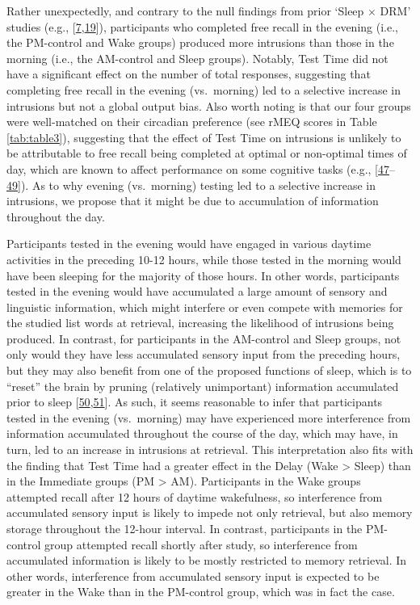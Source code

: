 \documentclass[
]{article}
\begin{document}
Rather unexpectedly, and contrary to the null findings from prior `Sleep \(\times\) DRM' studies (e.g., {[}\protect\hyperlink{ref-payne2009a}{7},\protect\hyperlink{ref-mckeon2012a}{19}{]}), participants who completed free recall in the evening (i.e., the PM-control and Wake groups) produced more intrusions than those in the morning (i.e., the AM-control and Sleep groups). Notably, Test Time did not have a significant effect on the number of total responses, suggesting that completing free recall in the evening (vs.~morning) led to a selective increase in intrusions but not a global output bias. Also worth noting is that our four groups were well-matched on their circadian preference (see rMEQ scores in Table \ref{tab:table3}), suggesting that the effect of Test Time on intrusions is unlikely to be attributable to free recall being completed at optimal or non-optimal times of day, which are known to affect performance on some cognitive tasks (e.g., {[}\protect\hyperlink{ref-hasher2002a}{47}--\protect\hyperlink{ref-may2005a}{49}{]}). As to why evening (vs.~morning) testing led to a selective increase in intrusions, we propose that it might be due to accumulation of information throughout the day.

Participants tested in the evening would have engaged in various daytime activities in the preceding 10-12 hours, while those tested in the morning would have been sleeping for the majority of those hours. In other words, participants tested in the evening would have accumulated a large amount of sensory and linguistic information, which might interfere or even compete with memories for the studied list words at retrieval, increasing the likelihood of intrusions being produced. In contrast, for participants in the AM-control and Sleep groups, not only would they have less accumulated sensory input from the preceding hours, but they may also benefit from one of the proposed functions of sleep, which is to ``reset'' the brain by pruning (relatively unimportant) information accumulated prior to sleep {[}\protect\hyperlink{ref-tononi2006a}{50},\protect\hyperlink{ref-tononi2014a}{51}{]}. As such, it seems reasonable to infer that participants tested in the evening (vs.~morning) may have experienced more interference from information accumulated throughout the course of the day, which may have, in turn, led to an increase in intrusions at retrieval. This interpretation also fits with the finding that Test Time had a greater effect in the Delay (Wake \textgreater{} Sleep) than in the Immediate groups (PM \textgreater{} AM). Participants in the Wake groups attempted recall after 12 hours of daytime wakefulness, so interference from accumulated sensory input is likely to impede not only retrieval, but also memory storage throughout the 12-hour interval. In contrast, participants in the PM-control group attempted recall shortly after study, so interference from accumulated information is likely to be mostly restricted to memory retrieval. In other words, interference from accumulated sensory input is expected to be greater in the Wake than in the PM-control group, which was in fact the case.
\end{document}
